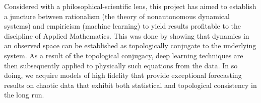 \documentclass[a4paper,12pt,twoside]{report}
\begin{document}
Considered with a philosophical-scientific lens, this project has aimed to establish a juncture between rationalism (the theory of nonautonomous dynamical systems) and empiricism (machine learning) to yield results profitable to the discipline of Applied Mathematics. This was done by showing that dynamics in an observed space can be established as topologically conjugate to the underlying system. As a result of the topological conjugacy, deep learning techniques are then subsequently applied to physically such equations from the data. In so doing, we acquire models of high fidelity that provide exceptional forecasting results on chaotic data that exhibit both statistical and topological consistency in the long run.



\end{document}
